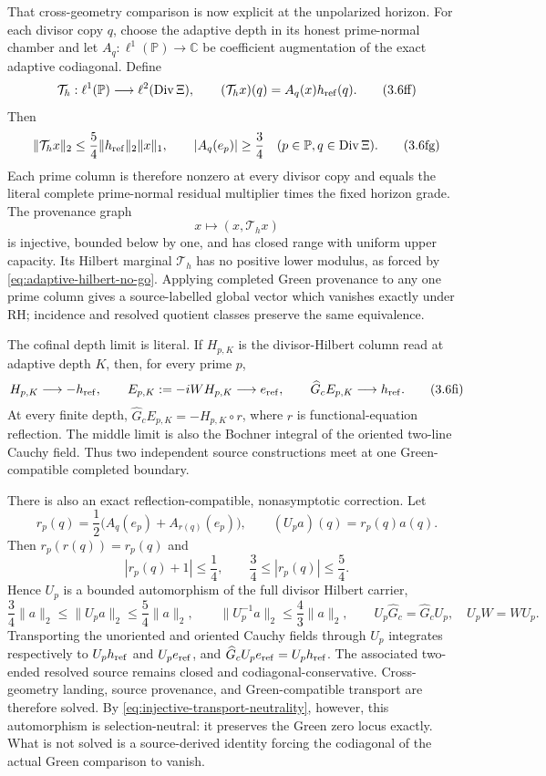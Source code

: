 \documentclass[11pt]{article}
\theoremstyle{definition}
\theoremstyle{remark}
\newcommand{\C}{\mathbb C}
\newcommand{\Div}{\operatorname{Div}}
\begin{document}
That cross-geometry comparison is now explicit at the unpolarized horizon.
For each divisor copy \(q\), choose the adaptive depth in its honest
prime-normal chamber and let \(A_q:\ell^1(\mathbb P)\to\C\) be coefficient
augmentation of the exact adaptive codiagonal.  Define
\[
 \mathcal T_h:\ell^1(\mathbb P)\longrightarrow\ell^2(\Div\Xi),
 \qquad
 (\mathcal T_hx)(q)=A_q(x)h_{\rm ref}(q).
\tag{3.6ff}\label{eq:adaptive-horizon-intertwiner}
\]
Then
\[
 \|\mathcal T_hx\|_2\le\frac54\|h_{\rm ref}\|_2\|x\|_1,
 \qquad
 |A_q(e_p)|\ge\frac34
 \quad(p\in\mathbb P, q\in\Div\Xi).
\tag{3.6fg}\label{eq:adaptive-horizon-column}
\]
Each prime column is therefore nonzero at every divisor copy and equals the
literal complete prime-normal residual multiplier times the fixed horizon
grade.  The provenance graph
\[
 x\longmapsto(x,\mathcal T_hx)
\tag{3.6fh}\label{eq:adaptive-horizon-provenance}
\]
is injective, bounded below by one, and has closed range with uniform upper
capacity.  Its Hilbert marginal \(\mathcal T_h\) has no positive lower
modulus, as forced by \eqref{eq:adaptive-hilbert-no-go}.  Applying completed
Green provenance to any one prime column gives a source-labelled global
vector which vanishes exactly under RH; incidence and resolved quotient
classes preserve the same equivalence.

The cofinal depth limit is literal.  If \(H_{p,K}\) is the divisor-Hilbert
column read at adaptive depth \(K\), then, for every prime \(p\),
\[
 H_{p,K}\longrightarrow-h_{\rm ref},\qquad
 E_{p,K}:=-iW H_{p,K}\longrightarrow e_{\rm ref},\qquad
 \widehat G_cE_{p,K}\longrightarrow h_{\rm ref}.
\tag{3.6fi}\label{eq:adaptive-green-boundary}
\]
At every finite depth,
\(\widehat G_cE_{p,K}=-H_{p,K}\circ r\), where \(r\) is
functional-equation reflection.  The middle limit is also the Bochner
integral of the oriented two-line Cauchy field.  Thus two independent source
constructions meet at one Green-compatible completed boundary.

There is also an exact reflection-compatible, nonasymptotic correction.
Let
\[
 r_p(q)=\frac12\bigl(A_q(e_p)+A_{r(q)}(e_p)\bigr),
 \qquad (U_pa)(q)=r_p(q)a(q).
\tag{3.6fj}\label{eq:reflected-adaptive-reader}
\]
Then \(r_p(r(q))=r_p(q)\) and
\[
 |r_p(q)+1|\le\frac14,\qquad
 \frac34\le |r_p(q)|\le\frac54 .
\tag{3.6fk}\label{eq:reflected-reader-bounds}
\]
Hence \(U_p\) is a bounded automorphism of the full divisor Hilbert carrier,
\[
 \frac34\|a\|_2\le\|U_pa\|_2\le\frac54\|a\|_2,\qquad
 \|U_p^{-1}a\|_2\le\frac43\|a\|_2,
 \qquad U_p\widehat G_c=\widehat G_cU_p,\quad U_pW=WU_p.
\tag{3.6fl}\label{eq:reflected-adaptive-automorphism}
\]
Transporting the unoriented and oriented Cauchy fields through \(U_p\)
integrates respectively to \(U_ph_{\rm ref}\) and \(U_pe_{\rm ref}\), and
\(\widehat G_cU_pe_{\rm ref}=U_ph_{\rm ref}\).
The associated two-ended resolved source remains closed and
codiagonal-conservative.  Cross-geometry landing, source provenance, and
Green-compatible transport are therefore solved.  By
\eqref{eq:injective-transport-neutrality}, however, this automorphism is
selection-neutral: it preserves the Green zero locus exactly.  What is not
solved is a source-derived identity forcing the codiagonal of the actual
Green comparison to vanish.
\end{document}
